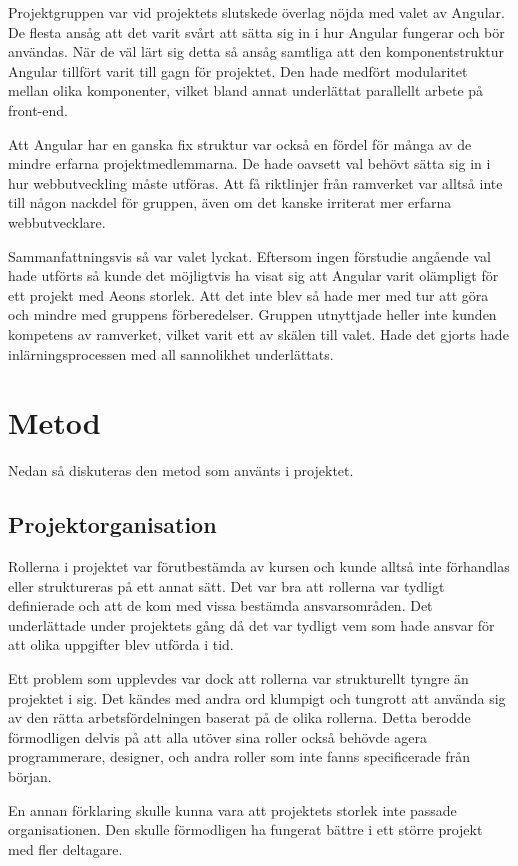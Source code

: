 Projektgruppen var vid projektets slutskede överlag nöjda med valet av Angular. De flesta ansåg att det varit svårt att sätta sig in i hur Angular fungerar och bör användas. När de väl lärt sig detta så ansåg samtliga att den komponentstruktur Angular tillfört varit till gagn för projektet. Den hade medfört modularitet mellan olika komponenter, vilket bland annat underlättat parallellt arbete på front-end.

Att Angular har en ganska fix struktur var också en fördel för många av de mindre erfarna projektmedlemmarna. De hade oavsett val behövt sätta sig in i hur webbutveckling måste utföras. Att få riktlinjer från ramverket var alltså inte till någon nackdel för gruppen, även om det kanske irriterat mer erfarna webbutvecklare.

Sammanfattningsvis så var valet lyckat. Eftersom ingen förstudie angående val hade utförts så kunde det möjligtvis ha visat sig att Angular varit olämpligt för ett projekt med Aeons storlek. Att det inte blev så hade mer med tur att göra och mindre med gruppens förberedelser. Gruppen utnyttjade heller inte kunden kompetens av ramverket, vilket varit ett av skälen till valet. Hade det gjorts hade inlärningsprocessen med all sannolikhet underlättats.

\section{Metod}
Nedan så diskuteras den metod som använts i projektet.

\subsection{Projektorganisation}
Rollerna i projektet var förutbestämda av kursen och kunde alltså inte förhandlas eller struktureras på ett annat sätt. Det var bra att rollerna var tydligt definierade och att de kom med vissa bestämda ansvarsområden. Det underlättade under projektets gång då det var tydligt vem som hade ansvar för att olika uppgifter blev utförda i tid.

Ett problem som upplevdes var dock att rollerna var strukturellt tyngre än projektet i sig. Det kändes med andra ord klumpigt och tungrott att använda sig av den rätta arbetsfördelningen baserat på de olika rollerna. Detta berodde förmodligen delvis på att alla utöver sina roller också behövde agera programmerare, designer, och andra roller som inte fanns specificerade från början.

En annan förklaring skulle kunna vara att projektets storlek inte passade organisationen. Den skulle förmodligen ha fungerat bättre i ett större projekt med fler deltagare.

